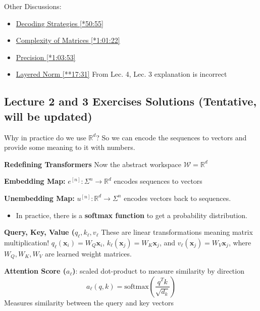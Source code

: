 \documentclass[12pt, twoside]{article}
\begin{document}
Other Discussions:
\begin{itemize}
    \item \href{https://youtu.be/1u6h3Nm3NvM?si=DPbOrvmmc-rPRJFs&t=3055}{Decoding Strategies [*50:55]}
    \item \href{https://youtu.be/1u6h3Nm3NvM?si=vG1ilQpx0IZ3sRSs&t=3682}{Complexity of Matrices [*1:01:22]}
    \item \href{https://youtu.be/1u6h3Nm3NvM?si=9r417PXiPrKnlHgQ&t=3833}{Precision [*1:03:53]}
    \item \href{https://youtu.be/2MRAX8EdBA8?si=O1TxoxJ9oHUUIL8z&t=1051}{Layered Norm [**17:31]} From Lec. 4, Lec. 3 explanation is incorrect
\end{itemize}


\newpage

\subsection*{Lecture 2 and 3 Exercises Solutions \small (Tentative, will be updated)}

\begin{soln}

Why in practice do we use $\mathbb{R}^d$? So we can encode the sequences to vectors and provide some meaning to it with numbers.

\textbf{Redefining Transformers}
Now the abstract workspace $\mathcal{W}=\mathbb{R}^d$

\textbf{Embedding Map:} $e^{[n]}: \Sigma^n \to \mathbb{R}^d$ encodes sequences to vectors

\textbf{Unembedding Map:} $u^{[n]}: \mathbb{R}^d \to \Sigma^n$ encodes vectors back to sequences.
\begin{itemize}
    \item In practice, there is a \textbf{softmax function} to get a probability distribution.
\end{itemize}

\textbf{Query, Key, Value ($q_\ell, k_\ell, v_\ell$} These are linear transformations meaning matrix multiplication! $q_\ell(\mathbf{x}_i) = W_Q \mathbf{x}_i$, $k_\ell(\mathbf{x}_j) = W_K \mathbf{x}_j$, and $v_\ell(\mathbf{x}_j) = W_V \mathbf{x}_j$, where $W_Q, W_K, W_V$ are learned weight matrices.

\textbf{Attention Score ($a_\ell$)}: scaled dot-product to measure similarity by direction
\[ a_\ell(q,k) = \text{softmax}\left(\frac{q^T k}{\sqrt{d_k}}\right) \]
Measures similarity between the query and key vectors

\end{soln}
\end{document}
